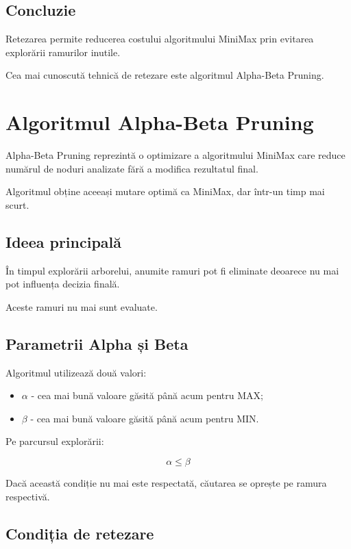 \documentclass[12pt,a4paper]{article}
\begin{document}
\subsection{Concluzie}

Retezarea permite reducerea costului algoritmului MiniMax prin evitarea explorării ramurilor inutile.

Cea mai cunoscută tehnică de retezare este algoritmul Alpha-Beta Pruning.







\section{Algoritmul Alpha-Beta Pruning}

Alpha-Beta Pruning reprezintă o optimizare a algoritmului MiniMax care reduce numărul de noduri analizate fără a modifica rezultatul final.

Algoritmul obține aceeași mutare optimă ca MiniMax, dar într-un timp mai scurt.

\subsection{Ideea principală}

În timpul explorării arborelui, anumite ramuri pot fi eliminate deoarece nu mai pot influența decizia finală.

Aceste ramuri nu mai sunt evaluate.

\subsection{Parametrii Alpha și Beta}

Algoritmul utilizează două valori:

\begin{itemize}
\item $\alpha$ - cea mai bună valoare găsită până acum pentru MAX;
\item $\beta$ - cea mai bună valoare găsită până acum pentru MIN.
\end{itemize}

Pe parcursul explorării:

\[
\alpha \leq \beta
\]

Dacă această condiție nu mai este respectată, căutarea se oprește pe ramura respectivă.

\subsection{Condiția de retezare}
\end{document}
